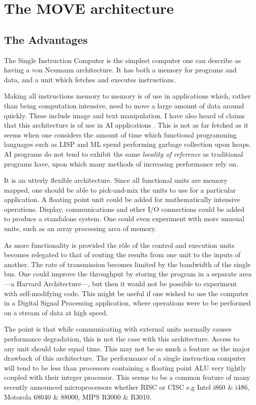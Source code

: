 \section{The MOVE architecture}
\subsection{The Advantages}
The Single Instruction Computer is the simplest computer one can describe as having a von Neumann architecture. It has both a memory for programs and data, and a unit which fetches and executes instructions.

Making all instructions memory to memory is of use in applications which, rather than being computation intensive, need to move a large amount of data around quickly. 
These  include image and text manipulation.
I have also heard of claims that this architecture is of use in AI applications \cite{mills:prolog}. 
This is not as far fetched as it seems when one considers the amount of time which functional programming languages such as LISP and ML spend performing garbage collection upon heaps. AI programs do not tend to exhibit the same {\em locality of reference} as traditional programs have, upon which many methods of increasing performance rely on.

It is an utterly flexible architecture. Since all functional units are memory mapped, one should be able to pick-and-mix the units to use for a particular application.
A floating point unit could be added for mathematically intensive operations. Display, communications and other I/O connections could be added to produce a standalone system. 
One could even experiment with more unusual units, such as an array processing area of memory.

As more functionality is provided the r\^{o}le of the control and execution units becomes relegated to that of routing the results from one unit to the inputs of another. 
The rate of transmission becomes limited by the bandwidth of the single bus. 
One could improve the throughput by storing the program in a separate area ---a Harvard Architecture---, but then it would not be possible to experiment with self-modifying code. This might be useful if one wished to use the computer in a Digital Signal Processing application, where   operations were to be performed on a stream of data at  high speed.

The point is that while communicating with external units normally causes performance degradation, this is not the case with this architecture. Access to any unit should take equal time. 
This may not be so much a feature as the major drawback of this architecture.
 The performance of a single instruction computer will tend to be less than processors containing a floating point ALU very tightly coupled with their integer processor.
This seems to be   a common feature of many  recently announced microprocessors  whether RISC or CISC e.g Intel i860 \& i486, Motorola 68040 \& 88000, MIPS R3000 \& R3010. 


